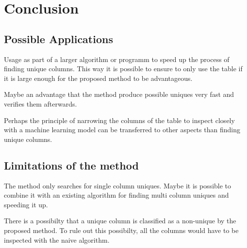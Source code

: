 \chapter{Conclusion} %

\section{Possible Applications}
Usage as part of a larger algorithm or programm to speed up the process of finding unique columns. This way it is possible to ensure to only use the table if it is large enough for the proposed method to be advantageous.

Maybe an advantage that the method produce possible uniques very fast and verifies them afterwards.

Perhaps the principle of narrowing the columns of the table to inspect closely with a machine learning model can be transferred to other aspects than finding unique columns.


\section{Limitations of the method}
The method only searches for single column uniques. Maybe it is possible to combine it with an existing algorithm for finding multi column uniques and speeding it up.

There is a possibilty that a unique column is classified as a non-unique by the proposed method. To rule out this possibilty, all the columns would have to be inspected with the naive algorithm.
